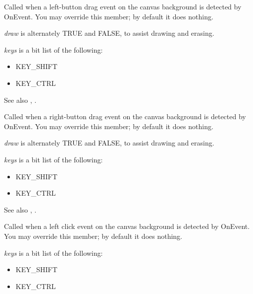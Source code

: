 
Called when a left-button drag event on the canvas background is detected by OnEvent. You may override this member;
by default it does nothing.

{\it draw} is alternately TRUE and FALSE, to assist drawing and erasing.

{\it keys} is a bit list of the following:

\begin{itemize}\itemsep=0pt
\item KEY\_SHIFT
\item KEY\_CTRL
\end{itemize}

See also , .

\label{ondragright}


Called when a right-button drag event on the canvas background is detected by OnEvent. You may override this member;
by default it does nothing.

{\it draw} is alternately TRUE and FALSE, to assist drawing and erasing.

{\it keys} is a bit list of the following:

\begin{itemize}\itemsep=0pt
\item KEY\_SHIFT
\item KEY\_CTRL
\end{itemize}

See also , .

\label{onleftclick}


Called when a left click event on the canvas background is detected by OnEvent. You may override this member;
by default it does nothing.

{\it keys} is a bit list of the following:

\begin{itemize}\itemsep=0pt
\item KEY\_SHIFT
\item KEY\_CTRL
\end{itemize}


